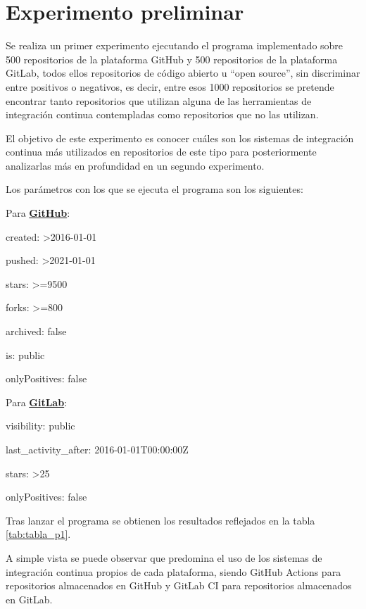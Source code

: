 \section{Experimento preliminar}
Se realiza un primer experimento ejecutando el programa implementado sobre 500 repositorios de la plataforma GitHub y 500 repositorios de la plataforma GitLab, todos ellos repositorios de código abierto u ``open source'', sin discriminar entre positivos o negativos, es decir, entre esos 1000 repositorios se pretende encontrar tanto repositorios que utilizan alguna de las herramientas de integración continua contempladas como repositorios que no las utilizan.

El objetivo de este experimento es conocer cuáles son los sistemas de integración continua más utilizados en repositorios de este tipo para posteriormente analizarlas más en profundidad en un segundo experimento.

Los parámetros con los que se ejecuta el programa son los siguientes:
\begin{compactitem}
    \item Para \textbf{\underline{GitHub}}:
    \begin{compactitem}
        \item created: \textgreater2016-01-01
        \item pushed: \textgreater2021-01-01
        \item stars: \textgreater=9500
        \item forks: \textgreater=800
        \item archived: false
        \item is: public
        \item onlyPositives: false
    \end{compactitem}
    \item Para \textbf{\underline{GitLab}}:
    \begin{compactitem}
        \item visibility: public
        \item last\_activity\_after: 2016-01-01T00:00:00Z
        \item stars: \textgreater25
        \item onlyPositives: false
    \end{compactitem}
\end{compactitem}

Tras lanzar el programa se obtienen los resultados reflejados en la tabla \ref{tab:tabla_p1}.

A simple vista se puede observar que predomina el uso de los sistemas de integración continua propios de cada plataforma, siendo GitHub Actions para repositorios almacenados en GitHub y GitLab CI para repositorios almacenados en GitLab.

